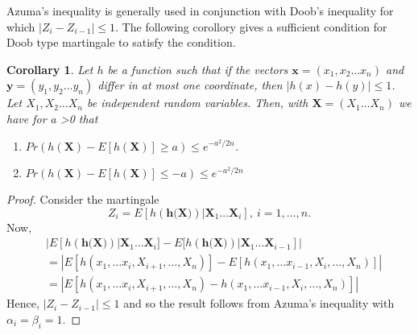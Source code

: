 \documentclass[a4paper,10pt]{article}
\theoremstyle{plain}
\newtheorem{cor}[thm]{Corollary}
\theoremstyle{definition}
\theoremstyle{remark}
\begin{document}
Azuma's inequality is generally used in conjunction with Doob's inequality for which $|Z_i-Z_{i-1}| \leq 1$. The following corollory gives a sufficient condition  for Doob type martingale to satisfy the condition.
\begin{cor}
Let $h$ be a function such that if the vectors $\textbf{x}=(x_1,x_2 \hdots x_n)$ and $\textbf{y}=(y_1,y_2 \hdots y_n)$ differ in at most one coordinate, then $|h(x)-h(y)| \leq 1$. Let $X_1,X_2 \hdots X_n$ be independent random variables. Then, with $\textbf{X}=(X_1 \hdots X_n)$ we have for a >0 that
\begin{enumerate}
\item $Pr(h(\textbf{X})-E[h(\textbf{X})] \geq a) \leq e^{-a^2/2n}$.
\item $Pr(h(\textbf{X})-E[h(\textbf{X})] \leq -a) \leq e^{-a^2/2n}$
\end{enumerate}
\end{cor}
\begin{proof}
Consider the martingale 
\begin{equation*}
Z_i =E[h(\textbf{h(X)})|\textbf{X}_1 \hdots \textbf{X}_i],~ i=1, \hdots , n.
\end{equation*}
Now, 
\begin{eqnarray*}
&|E[h(\textbf{h(X)})|\textbf{X}_1 \hdots \textbf{X}_i]-E[h(\textbf{h(X)})|\textbf{X}_1 \hdots \textbf{X}_{i-1}]|\\
&=|E[h(x_1,\hdots x_i,X_{i+1}, \hdots ,X_n)]-E[h(x_1,\hdots x_{i-1},X_{i}, \hdots ,X_n)]|\\
&=|E[h(x_1,\hdots x_i,X_{i+1}, \hdots ,X_n)-h(x_1,\hdots x_{i-1},X_{i}, \hdots ,X_n)]|
\end{eqnarray*}
Hence, $|Z_i-Z_{i-1}|\leq 1$ and so the result follows from Azuma's inequality with $\alpha_i=\beta_i=1$.
\end{proof}
\end{document}
